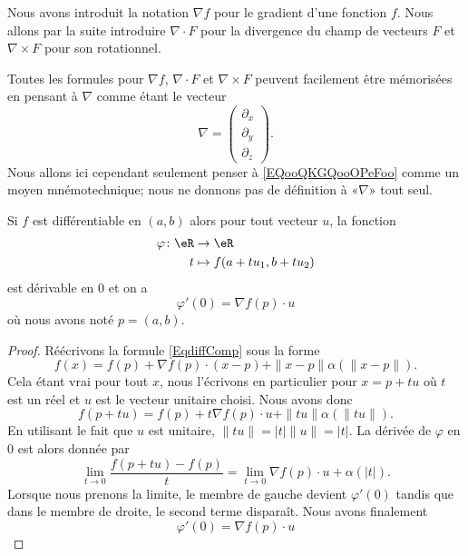 \begin{remark}
	Nous avons introduit la notation \( \nabla f\) pour le gradient d'une fonction \( f\). Nous allons par la suite introduire \( \nabla\cdot F\) pour la divergence du champ de vecteurs \( F\) et \( \nabla\times F\) pour son rotationnel.

	Toutes les formules pour \( \nabla f\), \( \nabla\cdot F\) et \( \nabla\times F\) peuvent facilement être mémorisées en pensant à \( \nabla\) comme étant le vecteur
	\begin{equation}        \label{EQooQKGQooOPeFoo}
		\nabla=\begin{pmatrix}
			\partial_x \\
			\partial_y \\
			\partial_z
		\end{pmatrix}.
	\end{equation}
	Nous allons ici cependant seulement penser à \eqref{EQooQKGQooOPeFoo} comme un moyen mnémotechnique; nous ne donnons pas de définition à «\( \nabla\)» tout seul.
\end{remark}

\begin{proposition}		\label{PROPooEYPKooAVjJRF}
	Si \( f\) est différentiable en \( (a,b)\) alors pour tout vecteur \( u\), la fonction
	\begin{equation}
		\begin{aligned}
			\varphi\colon \eR & \to \eR                    \\
			t                 & \mapsto   f(a+tu_1,b+tu_2)
		\end{aligned}
	\end{equation}
	est dérivable en \( 0\) et on a
	\begin{equation}
		\varphi'(0)=\nabla f(p)\cdot u
	\end{equation}
	où nous avons noté \( p=(a,b)\).
\end{proposition}

\begin{proof}
	Réécrivons la formule \eqref{EqdiffComp} sous la forme
	\begin{equation}
		f(x)=f(p)+\nabla f(p)\cdot (x-p)+\| x-p \|\alpha(\| x-p \|).
	\end{equation}
	Cela étant vrai pour tout \( x\), nous l'écrivons en particulier pour \( x=p+tu\) où \( t\) est un réel et \( u\) est le vecteur unitaire choisi. Nous avons donc
	\begin{equation}
		f(p+tu)=f(p)+t\nabla f(p)\cdot u+\| tu \|\alpha(\| tu \|).
	\end{equation}
	En utilisant le fait que \( u\) est unitaire, \( \| tu \|=| t |\| u \|=| t |\). La dérivée de \( \varphi\) en \( 0\) est alors donnée par
	\begin{equation}
		\lim_{t\to 0} \frac{ f(p+tu)-f(p) }{ t }=\lim_{t\to 0} \nabla f(p)\cdot u+\alpha(| t |).
	\end{equation}
	Lorsque nous prenons la limite, le membre de gauche devient \( \varphi'(0)\) tandis que dans le membre de droite, le second terme disparaît. Nous avons finalement
	\begin{equation}
		\varphi'(0)=\nabla f(p)\cdot u
	\end{equation}
\end{proof}



